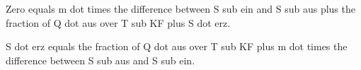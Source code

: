 Zero equals m dot times the difference between S sub ein and S sub aus plus the fraction of Q dot aus over T sub KF plus S dot erz.

S dot erz equals the fraction of Q dot aus over T sub KF plus m dot times the difference between S sub aus and S sub ein.